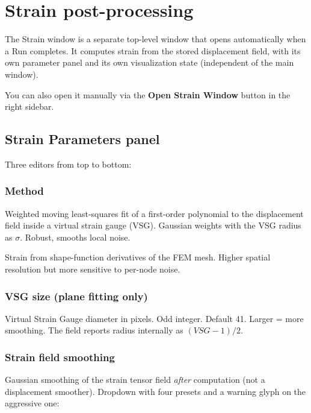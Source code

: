 \section{Strain post-processing}
\label{sec:strain-processing}

The Strain window is a separate top-level window that opens
automatically when a Run completes. It computes strain from the
stored displacement field, with its own parameter panel and its own
visualization state (independent of the main window).

You can also open it manually via the \textbf{Open Strain Window}
button in the right sidebar.

\subsection{Strain Parameters panel}

Three editors from top to bottom:

\subsubsection*{Method}

\begin{description}[leftmargin=1.2cm,style=nextline]
  \item[Plane fitting (default)]
    Weighted moving least-squares fit of a first-order polynomial to
    the displacement field inside a virtual strain gauge (VSG).
    Gaussian weights with the VSG radius as $\sigma$. Robust,
    smooths local noise.
  \item[FEM nodal]
    Strain from shape-function derivatives of the FEM mesh. Higher
    spatial resolution but more sensitive to per-node noise.
\end{description}

\subsubsection*{VSG size (plane fitting only)}

Virtual Strain Gauge diameter in pixels. Odd integer. Default 41.
Larger = more smoothing. The field reports radius internally as
$(VSG - 1) / 2$.

\subsubsection*{Strain field smoothing}

Gaussian smoothing of the strain tensor field \emph{after}
computation (not a displacement smoother). Dropdown with four
presets and a warning glyph on the aggressive one:


